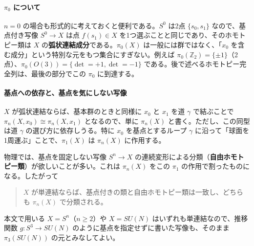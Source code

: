 \documentclass[uplatex, dvipdfmx, book]{jsbook}
\begin{document}
\paragraph{$\pi_0$ について}
$n = 0$ の場合も形式的に考えておくと便利である。$S^0$ は2点 $\{s_0, s_1\}$ なので、基点付き写像 $S^0 \to X$ は点 $f(s_1) \in X$ を1つ選ぶことと同じであり、そのホモトピー類は $X$ の\textbf{弧状連結成分}である。$\pi_0(X)$ は一般には群ではなく、「$x_0$ を含む成分」という特別な元をもつ集合にすぎない。例えば $\pi_0(\mathbb{Z}_2) = \{\pm 1\}$（2点）、$\pi_0(O(3)) = \{\det = +1, \det = -1\}$ である。後で述べるホモトピー完全列は、最後の部分でこの $\pi_0$ に到達する。

\paragraph{基点への依存と、基点を気にしない写像}
$X$ が弧状連結ならば、基本群のときと同様に $x_0$ と $x_1$ を道 $\gamma$ で結ぶことで $\pi_n(X, x_0) \cong \pi_n(X, x_1)$ となるので、単に $\pi_n(X)$ と書く。ただし、この同型は道 $\gamma$ の選び方に依存しうる。特に $x_0$ を基点とするループ $\gamma$ に沿って「球面を1周運ぶ」ことで、$\pi_1(X)$ は $\pi_n(X)$ に作用する。

物理では、基点を固定しない写像 $S^n \to X$ の連続変形による分類（\textbf{自由ホモトピー類}）が欲しいことが多い。これは $\pi_n(X)$ をこの $\pi_1$ の作用で割ったものになる。したがって
\begin{quote}
    $X$ が単連結ならば、基点付きの類と自由ホモトピー類は一致し、どちらも $\pi_n(X)$ で分類される。
\end{quote}
本文で用いる $X = S^n$（$n \ge 2$）や $X = SU(N)$ はいずれも単連結なので、推移関数 $g: S^3 \to SU(N)$ のように基点を指定せずに書いた写像も、そのまま $\pi_3(SU(N))$ の元とみなしてよい。
\end{document}
